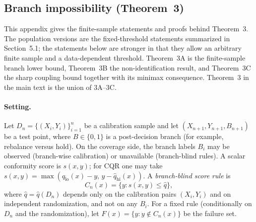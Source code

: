 %
%

\newtheorem*{aIVthmA}{Theorem 3A}
\newtheorem*{aIVthmB}{Theorem 3B}
\newtheorem*{aIVthmC}{Theorem 3C}
\newtheorem*{aIVlemA}{Lemma 1}
\newtheorem*{aIVlemB}{Lemma 2}
\newtheorem*{aIVremA}{Remark 1.1}

\providecommand{\theHequation}{}
\let\aIVtheHequation\theHequation
{}
\renewcommand{\theHequation}{aIV.\arabic{aIVanchor}}
\newcommand{\aIVfixedtag}[1]{\stepcounter{aIVanchor}\tag{#1}}

\subsection{Branch impossibility (Theorem~3)}\label{app:a4}

This appendix gives the finite-sample statements and proofs behind
Theorem~3.  The population versions are the fixed-threshold statements
summarized in Section~5.1; the statements below are stronger in that
they allow an arbitrary finite sample and a data-dependent threshold.  Theorem~3A is the finite-sample branch lower bound,
Theorem~3B the non-identification result, and Theorem~3C the sharp
coupling bound together with its minimax consequence.  Theorem~3 in the
main text is the union of 3A--3C.

\paragraph{Setting.}
Let $D_n=\{(X_i,Y_i)\}_{i=1}^n$ be a calibration sample and let
$(X_{n+1},Y_{n+1},B_{n+1})$ be a test point, where $B\in\{0,1\}$ is a
post-decision branch (for example, rebalance versus hold).  On the
coverage side, the branch labels $B_i$ may be observed (branch-wise
calibration) or unavailable (branch-blind rules).  A scalar conformity
score is $s(x,y)$; for CQR one may take
$s(x,y)=\max(\hat q_{\mathrm{lo}}(x)-y,\,y-\hat q_{\mathrm{hi}}(x))$.
A \emph{branch-blind score rule} is
\[
C_n(x)=\{y:s(x,y)\le\hat q\},
\]
where $\hat q=\hat q(D_n)$ depends only on the calibration pairs
$(X_i,Y_i)$ and on independent randomization, and not on any $B_i$.
For a fixed rule (conditionally on $D_n$ and the randomization), let
$F(x)=\{y:y\notin C_n(x)\}$ be the failure set.

